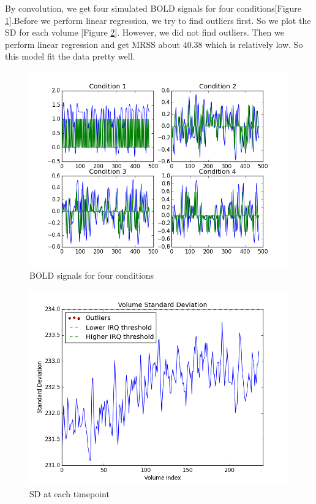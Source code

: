 \par \indent By convolution, we get four simulated BOLD signals for four
conditions[Figure \ref{fig:convolution}].Before we perform linear regression,
we try to find outliers first. So we plot the SD for each volume [Figure
\ref{fig:VolumeSD}]. However, we did not find outliers. Then we perform linear
regression and get MRSS about 40.38 which is relatively low. So this model fit
the data pretty well. 

\begin{figure}[ht]
\centering
\includegraphics[scale=0.5]{images/convolution4cond} 
\caption{BOLD signals for four conditions}
\label{fig:convolution}
\end{figure}

\begin{figure}[ht]
\centering
\includegraphics[scale=0.5]{images/vol_std}               
\caption{SD at each timepoint}
\label{fig:VolumeSD}
\end{figure}
